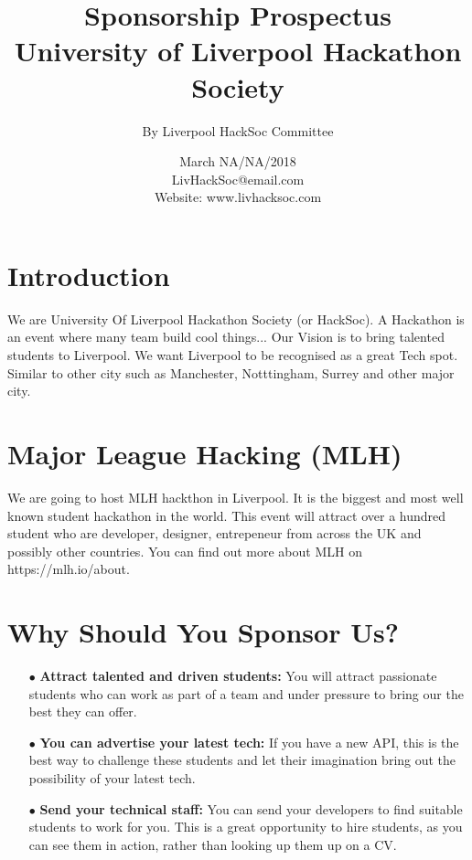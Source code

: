 \documentclass{report}
\title{%
        \textcolor{MyGold}{Sponsorship Prospectus} \\
      \large {University of Liverpool Hackathon Society}}
\author{By Liverpool HackSoc Committee}
\date{March NA/NA/2018 \\
        \textcolor{MyLinkBlue}{LivHackSoc@email.com} \\
        \large Website: www.livhacksoc.com \\ 
    }
\begin{document}
    \pagecolor{MyMidBlack}
    \color{white}
    \maketitle

    
    \section *{Introduction}
    We are University Of Liverpool Hackathon Society (or HackSoc). A Hackathon is an event where many team build cool things... Our Vision is to bring talented students to Liverpool. We want Liverpool to be recognised as a great Tech spot. Similar to other city such as Manchester, Notttingham, Surrey and other major city.

    \section *{Major League Hacking (MLH)}
    We are going to host MLH hackthon in Liverpool. It is the biggest and most well known student hackathon in the world. This event will attract over a hundred student who are developer, designer, entrepeneur from across the UK and possibly other countries. You can find out more about MLH on \textcolor{MyLinkBlue}{https://mlh.io/about}.
    
    
    \section *{Why Should You Sponsor Us?}
    
    \begin{itemize}
        \item[$\bullet$] \textbf{Attract talented and driven students: }You will attract passionate students
        who can work as part of a team and under pressure to bring our the best they can offer.
        \item[$\bullet$] \textbf{You can advertise your latest tech: }If you have a new API, this is the 
        best way to challenge these students and let their imagination bring out the possibility of your latest
        tech.
        \item[$\bullet$] \textbf{Send your technical staff: }You can send your developers to find suitable 
        students to work for you. This is a great opportunity to hire students, as you can see them in action, 
        rather than looking up them up on a CV.
    
    \end{itemize}
     
\end{document}
